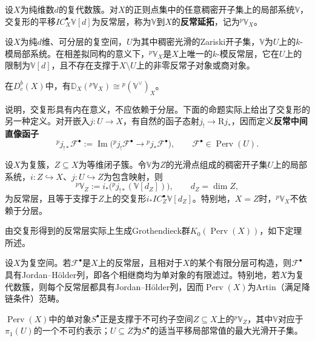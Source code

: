 设$X$为纯维数$d$的复代数簇。对$X$的正则点集中的任意稠密开子集上的局部系统$\mathbb V$，交复形的平移$IC_X^\bullet\mathbb V[d]$为反常层，称为$\mathbb V$到$X$的\textbf{反常延拓}，记为${}^p\mathbb V_X$。
\begin{theorem}\label{L13S3O1}
设$X$为纯$d$维、可分层的复空间，$U$为其中稠密光滑的Zariski开子集，$\mathbb V$为$U$上的$k$-模局部系统。在相差拟同构的意义下，${}^p\mathbb V_X$是$X$上唯一的$k$-模反常层，它在$U$上的限制为$\mathbb V[d]$，且不存在支撑于$X\setminus U$上的非零反常子对象或商对象。
\end{theorem}
\begin{corollary}\label{L13S3O2}
在$D_c^b(X)$中，有$\mathbb D_X({}^p\mathbb V_X)\cong{}^p(\mathbb V^\vee)_X$。
\end{corollary}
说明，交复形具有内在意义，不应依赖于分层。下面的命题实际上给出了交复形的另一种定义。对开嵌入$j:U\to X$，有自然的函子态射$j_!\to\mathrm Rj_*$，因而定义\textbf{反常中间直像函子}
\[{}^pj_{!*}\mathcal F^\bullet:=\operatorname{Im}\bigl({}^pj_!\mathcal F^\bullet\to{}^pj_*\mathcal F^\bullet\bigr),\qquad\mathcal F^\bullet\in\operatorname{Perv}(U).\]
\begin{proposition}\label{L13S3O3}
设$X$为复簇，$Z\subseteq X$为等维闭子簇。令$\mathbb V$为$Z$的光滑点组成的稠密开子集$U$上的局部系统，$i:Z\hookrightarrow X$、$j:U\hookrightarrow Z$为包含映射，则
\[{}^p\mathbb V_Z:=i_*\bigl({}^pj_{!*}(\mathbb V[d_Z])\bigr),\qquad d_Z=\dim Z,\]
为反常层，且等于支撑于$Z$上的交复形$i_*IC_Z^\bullet\mathbb V[d_Z]$。特别地，$X=Z$时，${}^p\mathbb V_X$不依赖于分层。
\end{proposition}
由交复形得到的反常层实际上生成Grothendieck群$K_0(\operatorname{Perv}(X))$，如下定理所述。
\begin{theorem}\label{L13S3O4}
设$X$为复空间。若$\mathcal F^\bullet$是$X$上的反常层，且相对于$X$的某个有限分层可构造，则$\mathcal F^\bullet$具有Jordan--Hölder列，即各个相继商均为单对象的有限滤过。特别地，若$X$为复代数簇，则每个反常层都具有Jordan--Hölder列，因而$\operatorname{Perv}(X)$为Artin（满足降链条件）范畴。

$\operatorname{Perv}(X)$中的单对象$S^\bullet$正是支撑于不可约子空间$Z\subseteq X$上的${}^p\mathbb V_Z$，其中$\mathbb V$对应于$\pi_1(U)$的一个不可约表示；$U\subseteq Z$为$S^\bullet$的适当平移局部常值的最大光滑开子集。
\end{theorem}

